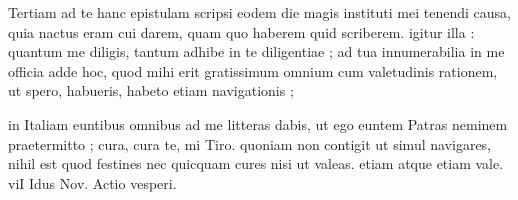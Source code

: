 


 Tertiam ad te hanc epistulam scripsi eodem die magis instituti mei tenendi causa, quia nactus eram cui darem, quam quo haberem quid scriberem. igitur illa : quantum me diligis, tantum adhibe in te diligentiae ; ad tua innumerabilia in me officia adde hoc, quod mihi erit gratissimum omnium cum valetudinis rationem, ut spero, habueris, habeto etiam navigationis ;

 in Italiam euntibus omnibus ad me litteras dabis, ut ego euntem Patras neminem praetermitto ; cura, cura te, mi Tiro. quoniam non contigit ut simul navigares, nihil est quod festines nec quicquam cures nisi ut valeas. etiam atque etiam vale. viI Idus Nov. Actio vesperi.
